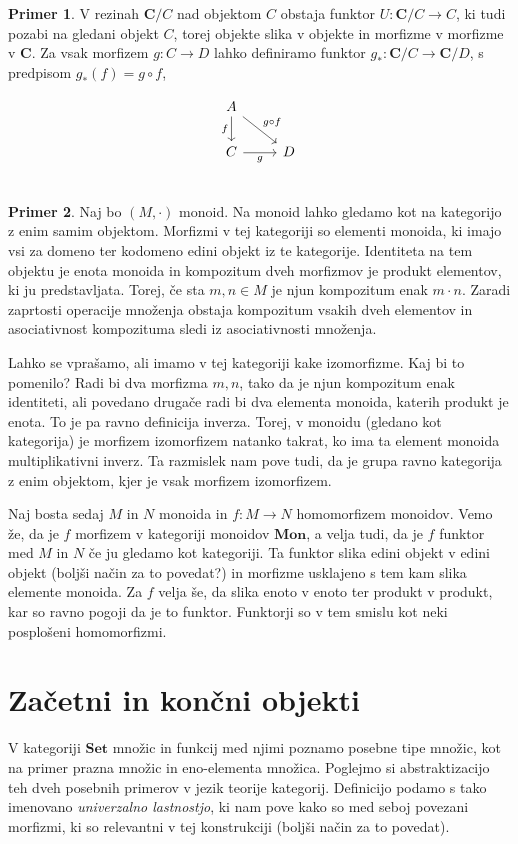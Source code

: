 \documentclass[12pt,a4paper]{book}
\theoremstyle{definition}
\theoremstyle{plain}
\theoremstyle{definition}
\newtheorem{primer}{Primer}[section]
\theoremstyle{remark}
\newcommand{\cat}[1]{\textbf{#1}}
\begin{document}
\begin{primer}
V rezinah $\cat{C}/C$ nad objektom $C$ obstaja funktor $U : \cat{C}/C \to C$, ki tudi pozabi na gledani objekt $C$, torej objekte slika v objekte in morfizme v morfizme v $\cat{C}$. Za vsak morfizem $g : C \to D$ lahko definiramo funktor $g_* : \cat{C}/C \to \cat{C}/D$, s predpisom $g_*(f) = g \circ f$,

$$\begin{tikzcd}
A \ar[d, "f"'] \ar[dr, "g \circ f"] & \\
C \ar[r, "g"'] & D \\
\end{tikzcd}$$

\end{primer}

\begin{primer}
Naj bo $(M,\cdot)$ monoid. Na monoid lahko gledamo kot na kategorijo z enim samim objektom. Morfizmi v tej kategoriji so elementi monoida, ki imajo vsi za domeno ter kodomeno edini objekt iz te kategorije. Identiteta na tem objektu je enota monoida in kompozitum dveh morfizmov je produkt elementov, ki ju predstavljata. Torej, če sta $m,n \in M$ je njun kompozitum enak $m \cdot n$. Zaradi zaprtosti operacije množenja obstaja kompozitum vsakih dveh elementov in asociativnost kompozituma sledi iz asociativnosti množenja.

Lahko se vprašamo, ali imamo v tej kategoriji kake izomorfizme. Kaj bi to pomenilo? Radi bi dva morfizma $m,n$, tako da je njun kompozitum enak identiteti, ali povedano drugače radi bi dva elementa monoida, katerih produkt je enota. To je pa ravno definicija inverza. Torej, v monoidu (gledano kot kategorija) je morfizem izomorfizem natanko takrat, ko ima ta element monoida multiplikativni inverz. Ta razmislek nam pove tudi, da je grupa ravno kategorija z enim objektom, kjer je vsak morfizem izomorfizem.

Naj bosta sedaj $M$ in $N$ monoida in $f : M \to N$ homomorfizem monoidov. Vemo že, da je $f$ morfizem v kategoriji monoidov $\cat{Mon}$, a velja tudi, da je $f$ funktor med $M$ in $N$ če ju gledamo kot kategoriji. Ta funktor slika edini objekt v edini objekt (boljši način za to povedat?) in morfizme usklajeno s tem kam slika elemente monoida. Za $f$ velja še, da slika enoto v enoto ter produkt v produkt, kar so ravno pogoji da je to funktor. Funktorji so v tem smislu kot neki posplošeni homomorfizmi.
\end{primer}


\section{Začetni in končni objekti}
V kategoriji $\cat{Set}$ množic in funkcij med njimi poznamo posebne tipe množic, kot na primer prazna množic in eno-elementa množica. Poglejmo si abstraktizacijo teh dveh posebnih primerov v jezik teorije kategorij. Definicijo podamo s tako imenovano \textit{univerzalno lastnostjo}, ki nam pove kako so med seboj povezani morfizmi, ki so relevantni v tej konstrukciji (boljši način za to povedat).
\end{document}

